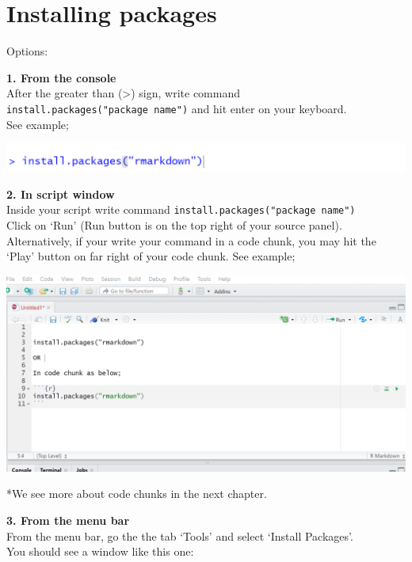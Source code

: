 \documentclass[
]{book}
\let\origfigure\figure
\let\endorigfigure\endfigure
\renewenvironment{figure}[1][2] {
    \expandafter\origfigure\expandafter[H]
} {
    \endorigfigure
}
\begin{document}
\hypertarget{installing-packages}{%
\section{Installing packages}\label{installing-packages}}

Options:

\textbf{1. From the console}\\
After the greater than (\textgreater) sign, write command \texttt{install.packages("package\ name")} and hit enter on your keyboard.\\
See example;

\begin{figure}
\centering
\includegraphics{tutorial_screenshots/install_rmkdn_console.png}
\caption{install packages from console}
\end{figure}

\textbf{2. In script window }\\
Inside your script write command \texttt{install.packages("package\ name")}\\
Click on `Run' (Run button is on the top right of your source panel).\\
Alternatively, if your write your command in a code chunk, you may hit the `Play' button on far right of your code chunk. See example;

\begin{figure}
\centering
\includegraphics{tutorial_screenshots/install_rmkdn_scrpt.png}
\caption{install packages from script wnindow}
\end{figure}

*We see more about code chunks in the next chapter.

\textbf{3. From the menu bar }\\
From the menu bar, go the the tab `Tools' and select `Install Packages'.\\
You should see a window like this one:
\end{document}
